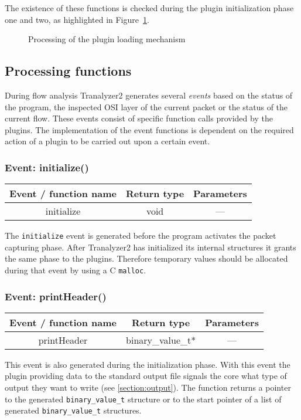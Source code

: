 \documentclass[documentation]{subfiles}
\begin{document}
The existence of these functions is checked during the plugin initialization phase one and two, as highlighted in Figure~\ref{fig:plugin_loading}.

\begin{figure}[!ht]
    \centering
    \caption{Processing of the plugin loading mechanism}
    \label{fig:plugin_loading}
\end{figure}

\subsection{Processing functions}
During flow analysis Tranalyzer2 generates several {\em events} based on the status of the program, the inspected OSI layer of the current packet or the status of the current flow. These events consist of specific function calls provided by the plugins. The implementation of the event functions is dependent on the required action of a plugin to be carried out upon a certain event.

\subsubsection{Event: initialize()}
\begin{longtable}{ccc}
    \toprule
    {\bf Event / function name} & {\bf Return type} & {\bf Parameters} \\
    \midrule\endhead%
    initialize & void & --- \\
    \bottomrule
\end{longtable}
The {\tt initialize} event is generated before the program activates the packet capturing phase. After Tranalyzer2 has initialized its internal structures it grants the same phase to the plugins. Therefore temporary values should be allocated during that event by using a C {\tt malloc}.

\subsubsection{Event: printHeader()}
\begin{longtable}{ccc}
    \toprule
    {\bf Event / function name} & {\bf Return type} & {\bf Parameters} \\
    \midrule\endhead%
    printHeader & binary\_value\_t* & --- \\
    \bottomrule
\end{longtable}
This event is also generated during the initialization phase. With this event the plugin providing data to the standard output file signals the core what type of output they want to write (see \ref{section:output}). The function returns a pointer to the generated {\tt binary\_value\_t} structure or to the start pointer of a list of generated {\tt binary\_value\_t} structures.
\end{document}
